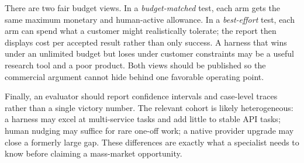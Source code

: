 There are two fair budget views. In a \emph{budget-matched} test, each arm gets the same maximum monetary and human-active allowance. In a \emph{best-effort} test, each arm can spend what a customer might realistically tolerate; the report then displays cost per accepted result rather than only success. A harness that wins under an unlimited budget but loses under customer constraints may be a useful research tool and a poor product. Both views should be published so the commercial argument cannot hide behind one favorable operating point.

Finally, an evaluator should report confidence intervals and case-level traces rather than a single victory number. The relevant cohort is likely heterogeneous: a harness may excel at multi-service tasks and add little to stable API tasks; human nudging may suffice for rare one-off work; a native provider upgrade may close a formerly large gap. These differences are exactly what a specialist needs to know before claiming a mass-market opportunity.
